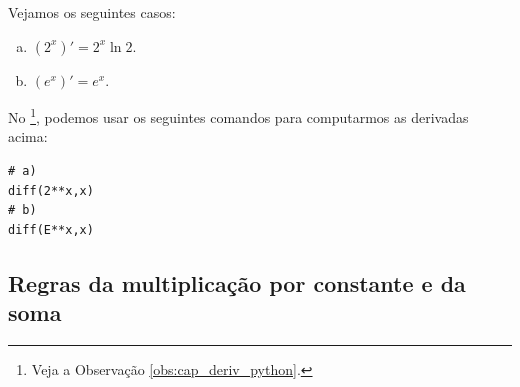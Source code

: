 \begin{ex}
Vejamos os seguintes casos:
\begin{enumerate}[a)]
\item $(2^x)' = 2^x\ln 2$.
\item $(e^x)' = e^x$.
\end{enumerate}

\ifispython
No \sympy\footnote{Veja a Observação \ref{obs:cap_deriv_python}.}, podemos usar os seguintes comandos para computarmos as derivadas acima:
\begin{verbatim}
# a)
diff(2**x,x)
# b)
diff(E**x,x)
\end{verbatim}
\fi
\end{ex}

\subsection{Regras da multiplicação por constante e da soma}

